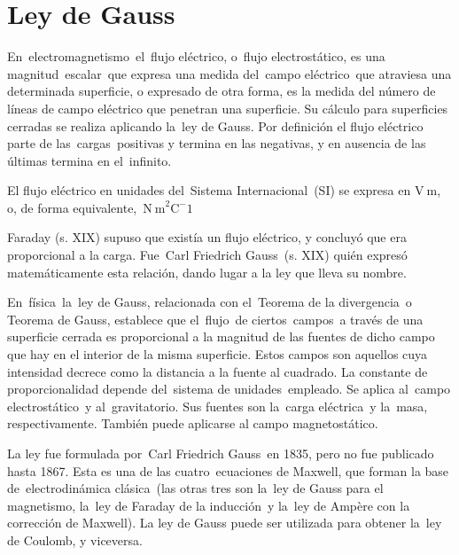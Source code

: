 \chapter{Ley de Gauss}

\begin{miparrafo}

En electromagnetismo el flujo eléctrico, o flujo electrostático, es una magnitud escalar que expresa una medida del campo eléctrico que atraviesa una determinada superficie, o expresado de otra forma, es la medida del número de líneas de campo eléctrico que penetran una superficie. Su cálculo para superficies cerradas se realiza aplicando la ley de Gauss. Por definición el flujo eléctrico parte de las cargas positivas y termina en las negativas, y en ausencia de las últimas termina en el infinito. 


El flujo eléctrico en unidades del Sistema Internacional (SI) se expresa en $\mathrm{V\ m}$, o, de forma equivalente, $\mathrm{N\ m}^2 \mathrm{C}^{-}1$ 


Faraday (s. XIX) supuso que existía un flujo eléctrico, y concluyó que era proporcional a la carga. Fue Carl Friedrich Gauss (s. XIX) quién expresó matemáticamente esta relación, dando lugar a la ley que lleva su nombre.


En física la ley de Gauss, relacionada con el Teorema de la divergencia o Teorema de Gauss, establece que el flujo de ciertos campos a través de una superficie cerrada es proporcional a la magnitud de las fuentes de dicho campo que hay en el interior de la misma superficie. Estos campos son aquellos cuya intensidad decrece como la distancia a la fuente al cuadrado. La constante de proporcionalidad depende del sistema de unidades empleado.
Se aplica al campo electrostático y al gravitatorio. Sus fuentes son la carga eléctrica y la masa, respectivamente. También puede aplicarse al campo magnetostático.

La ley fue formulada por Carl Friedrich Gauss en 1835, pero no fue publicado hasta 1867. Esta es una de las cuatro ecuaciones de Maxwell, que forman la base de electrodinámica clásica (las otras tres son la ley de Gauss para el magnetismo, la ley de Faraday de la inducción y la ley de Ampère con la corrección de Maxwell). La ley de Gauss puede ser utilizada para obtener la ley de Coulomb, y viceversa.

\end{miparrafo}

